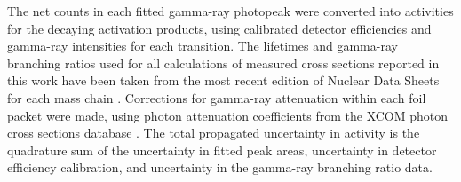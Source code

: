 The net  counts in each fitted gamma-ray photopeak were converted into  activities for the decaying  activation products, using calibrated detector efficiencies and gamma-ray intensities for each transition.
% 
% 
% 
The   lifetimes and gamma-ray branching ratios  used for all calculations of measured cross sections reported in this work  have been taken from the most recent edition of  Nuclear Data Sheets for each  mass chain
\cite{Singh2015a,Chen2011a,Wu2000,Burrows2007,Burrows2006,Burrows2008,Wang2017,Dong2015,Dong2014,JUNDE2008787,Junde2011,Bhat1998,Nesaraja2010,Browne2013,Zuber20151,NICHOLS2012973,ERJUN2001,Singh2007}.
Corrections for gamma-ray attenuation within each foil packet were made, using  photon attenuation coefficients from the XCOM photon cross sections database  \cite{berger2011xcom}.
The total propagated uncertainty in  activity is the quadrature sum of the uncertainty in  fitted peak areas, uncertainty in detector efficiency calibration, and uncertainty in the gamma-ray branching ratio data.




